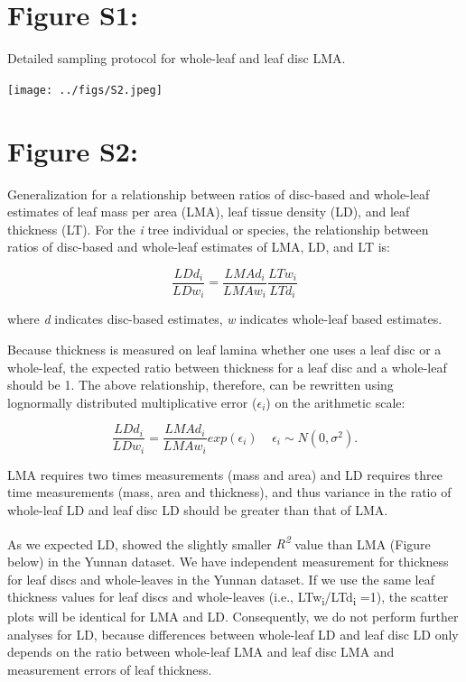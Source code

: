 \documentclass[
  12pt,
]{article}
\begin{document}
\newpage

\hypertarget{figure-s1}{%
\section{Figure S1:}\label{figure-s1}}

Detailed sampling protocol for whole-leaf and leaf disc LMA.

\begin{center}
\texttt{[image: ../figs/S2.jpeg]}

\end{center}

\newpage

\hypertarget{figure-s2}{%
\section{Figure S2:}\label{figure-s2}}

Generalization for a relationship between ratios of disc-based and whole-leaf estimates of leaf mass per area (LMA), leaf tissue density (LD), and leaf thickness (LT).
For the \emph{i} tree individual or species, the relationship between ratios of disc-based and whole-leaf estimates of LMA, LD, and LT is:

\[
\frac{LDd_i}{LDw_i} = \frac{LMAd_i}{LMAw_i} \frac{LTw_i}{LTd_i}
\]

where \emph{d} indicates disc-based estimates, \emph{w} indicates whole-leaf based estimates.

Because thickness is measured on leaf lamina whether one uses a leaf disc or a whole-leaf, the expected ratio between thickness for a leaf disc and a whole-leaf should be 1.
The above relationship, therefore, can be rewritten using lognormally distributed multiplicative error (\(\epsilon_i\)) on the arithmetic scale:

\[
\frac{LDd_i}{LDw_i} = \frac{LMAd_i}{LMAw_i} exp(\epsilon_i) \;\;\;\;\epsilon_i \sim N(0, \sigma^2).
\]

LMA requires two times measurements (mass and area) and LD requires three time measurements (mass, area and thickness), and thus variance in the ratio of whole-leaf LD and leaf disc LD should be greater than that of LMA.

As we expected LD, showed the slightly smaller \emph{R\textsuperscript{2}} value than LMA (Figure below) in the Yunnan dataset.
We have independent measurement for thickness for leaf discs and whole-leaves in the Yunnan dataset.
If we use the same leaf thickness values for leaf discs and whole-leaves (i.e., LTw\textsubscript{i}/LTd\textsubscript{i} =1), the scatter plots will be identical for LMA and LD.
Consequently, we do not perform further analyses for LD, because differences between whole-leaf LD and leaf disc LD only depends on the ratio between whole-leaf LMA and leaf disc LMA and measurement errors of leaf thickness.
\end{document}
